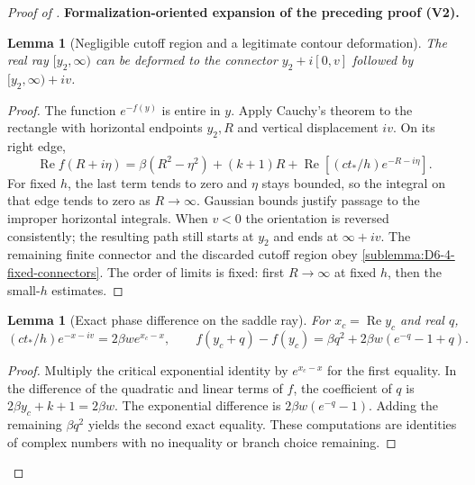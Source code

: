 \documentclass[11pt]{article}
\newtheorem{lemma}[theorem]{Lemma}
\newcommand{\formalisationparentid}{X}
\newenvironment{formalisationaddition}[1]{\par\medskip\begingroup\color{blue}\def\formalisationparentid{#1}\setcounter{formalizationsublemma}{0}\let\lemma\formalizationsublemma\let\endlemma\endformalizationsublemma
  \def\Eo{\mathcal E_h^\circ}\def\EE{\mathcal E_h}\def\phio{\phi_h^\circ}\def\phih{\phi_h}\def\Ho{H_h^{\rm atom}(v^\circ)}\def\Ha{H_h^{\rm atom}}\def\HL{H_h^{L}}\def\Dh{D_h}\def\Log{\operatorname{Log}}\def\ellh{\ell_h}\def\Gp{G_{p,h}}\def\Ast{A_{*,h}}\def\ahat{\widehat{\mathfrak a}_h}\def\ah{\mathfrak a_h}\def\rh{\widehat\rho_h}\def\deltah{\widehat\delta_h}\def\oldref##1{\textup{(##1)}}\def\interface##1{\par\noindent\textit{Analytical interface used here.} ##1\par}\def\finish{\par\noindent\textit{Conclusion of the formalization-oriented expansion.} }\par\noindent\textbf{Formalization-oriented expansion of the preceding proof (V2).}\par\smallskip
}{\par\endgroup\medskip
}
\newcommand{\Rea}{\operatorname{Re}}
\begin{document}
\begin{proof}[Proof of ]
\begin{formalisationaddition}{D-T6.4}
\begin{lemma}[Negligible cutoff region and a legitimate contour deformation]\label{sublemma:D6-4-deformation}
The real ray $[y_2,\infty)$ can be deformed to the connector
$y_2+i[0,v]$ followed by $[y_2,\infty)+iv$.
\end{lemma}
\begin{proof}
The function $e^{-f(y)}$ is entire in $y$.
Apply Cauchy's theorem to the rectangle with horizontal endpoints
$y_2,R$ and vertical displacement $iv$. On its right edge,
\[
 \Rea f(R+i\eta)
 =\beta(R^2-\eta^2)+(k+1)R
       +\Rea[(ct_*/h)e^{-R-i\eta}].
\]
For fixed $h$, the last term tends to zero and $\eta$ stays bounded,
so the integral on that edge tends to zero as $R\to\infty$.
Gaussian bounds justify passage to the improper horizontal integrals.
When $v<0$ the orientation is reversed consistently; the resulting
path still starts at $y_2$ and ends at $\infty+iv$.
The remaining finite connector and the discarded cutoff region obey
\ref{sublemma:D6-4-fixed-connectors}. The order of limits is fixed:
first $R\to\infty$ at fixed $h$, then the small-$h$ estimates.
\end{proof}

\begin{lemma}[Exact phase difference on the saddle ray]\label{sublemma:D6-4-phase-difference}
For $x_c=\Rea y_c$ and real $q$,
\[
 (ct_*/h)e^{-x-iv}=2\beta w e^{x_c-x},\qquad
 f(y_c+q)-f(y_c)=\beta q^2+2\beta w(e^{-q}-1+q).
\]
\end{lemma}
\begin{proof}
Multiply the critical exponential identity by $e^{x_c-x}$ for the
first equality. In the difference of the quadratic and linear terms
of $f$, the coefficient of $q$ is
$2\beta y_c+k+1=2\beta w$. The exponential difference is
$2\beta w(e^{-q}-1)$. Adding the remaining $\beta q^2$ yields the
second exact equality. These computations are identities of complex
numbers with no inequality or branch choice remaining.
\end{proof}


\end{formalisationaddition}
\end{proof}
\end{document}
